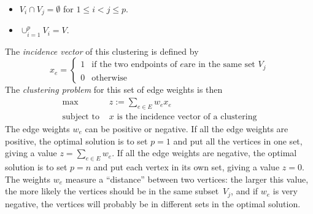 \begin{enumerate}
\begin{itemize}
 \item $V_i \cap V_j = \emptyset$ for $1\leq i < j \leq p$.
 \item $\cup_{i=1}^p V_i=V$.
\end{itemize}
The {\em incidence vector} of this clustering is defined by
\begin{displaymath}
  x_e = \left\{ \begin{array}{ll} 1 & \mbox{if the two endpoints of $e$
               are in the same set $V_j$}  \\  0 & \mbox{otherwise}
        \end{array}  \right.
\end{displaymath}
The {\em clustering problem} for this set of edge weights is then
\begin{displaymath}
\begin{array}{ll}
 \max & z:=\sum_{e\in E}w_ex_e \\
  \mbox{subject to } & x \mbox{ is the incidence vector of a}
                         \mbox{ clustering}
\end{array}
\end{displaymath}
The edge weights $w_e$ can be positive or negative.
If all the edge weights are positive, the optimal solution
is to set $p=1$ and put all the vertices in one set,
giving a value $z=\sum_{e \in E}w_e$.
If all the edge weights are negative, the optimal solution is
to set $p=n$ and put each vertex in its own set,
giving a value $z=0$.
The weights $w_e$ measure a ``distance'' between two vertices:
the larger this value, the more likely the vertices should be
in the same subset~$V_j$, and if $w_e$ is very negative,
the vertices will probably be in different sets in the optimal
solution.


\end{enumerate}
